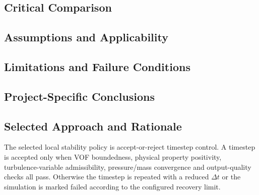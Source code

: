 \subsection{Critical Comparison}
\label{sec:res-num-stb-critical-comparison}


\subsection{Assumptions and Applicability}
\label{sec:res-num-stb-assumptions}


\subsection{Limitations and Failure Conditions}
\label{sec:res-num-stb-limitations}


\subsection{Project-Specific Conclusions}
\label{sec:res-num-stb-conclusions}


\subsection{Selected Approach and Rationale}
\label{sec:res-num-stb-selected-approach}


The selected local stability policy is accept-or-reject timestep
control. A timestep is accepted only when VOF boundedness, physical
property positivity, turbulence-variable admissibility, pressure/mass
convergence and output-quality checks all pass. Otherwise the timestep
is repeated with a reduced $\Delta t$ or the simulation is marked
failed according to the configured recovery limit.

